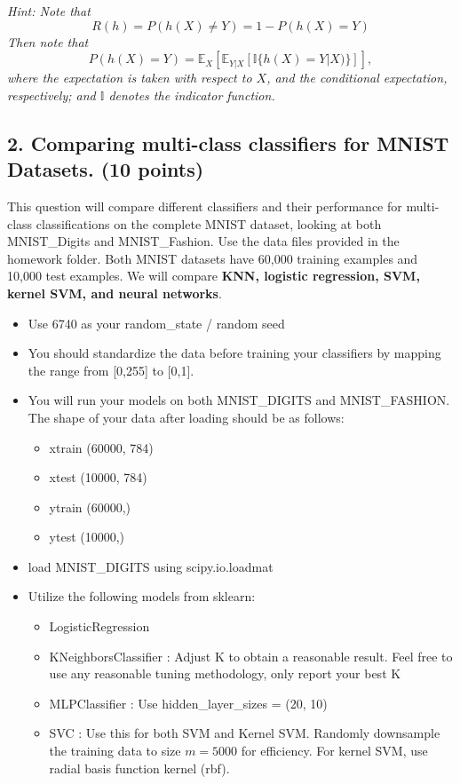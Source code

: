 \documentclass[twoside,10pt]{article}
\begin{document}
\textit{\small 
Hint: Note that
\[R(h) = P(h(X)\neq Y) = 1-P(h(X) = Y)\]
Then note that 
\[P(h(X) = Y)= \mathbb E_{X} [\mathbb E_{Y|X} [\mathbb I\{h(X)= Y|X)\}]],\]
where the expectation is taken with respect to $X$, and the conditional expectation, respectively; and $\mathbb I$ denotes the indicator function. }


\subsection*{2. Comparing multi-class classifiers for MNIST Datasets. (10 points)}

This question will compare different classifiers and their performance for multi-class classifications on the complete MNIST dataset, looking at both MNIST\_Digits and MNIST\_Fashion. Use the data files provided in the homework folder. Both MNIST datasets have 60,000 training examples and 10,000 test examples. We will compare {\bf KNN, logistic regression, SVM, kernel SVM, and neural networks}. 

\begin{itemize}[noitemsep]

\item Use 6740 as your random\_state / random seed
\item You should standardize the data before training your classifiers by mapping the range from [0,255] to [0,1].

\item You will run your models on both MNIST\_DIGITS and MNIST\_FASHION. The shape of your data after loading should be as follows:
    \begin{itemize}
        \item xtrain (60000, 784)
        \item xtest (10000, 784)
        \item ytrain (60000,)
        \item ytest (10000,)
    \end{itemize}

\item load MNIST\_DIGITS using scipy.io.loadmat

\item Utilize the following models from sklearn: 
  \begin{itemize}
    \item LogisticRegression
    \item KNeighborsClassifier : Adjust K to obtain a reasonable result. Feel free to use any reasonable tuning methodology, only report your best K
    \item MLPClassifier : Use \textsf{hidden\_layer\_sizes = (20, 10)}
    \item SVC : Use this for both SVM and Kernel SVM. Randomly downsample the training data to size $m=5000$ for efficiency. For kernel SVM, use radial basis function kernel (rbf).
  \end{itemize}
\end{itemize}
\end{document}
